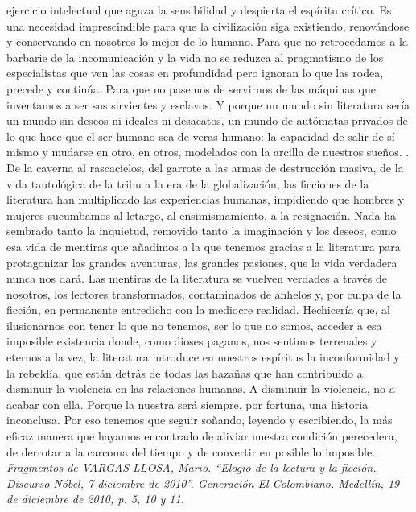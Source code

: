 \documentclass[a4paper,12pt]{article}
\begin{document}
ejercicio intelectual que aguza la sensibilidad y despierta el espíritu crítico. Es una necesidad imprescindible para que la civilización siga existiendo, renovándose y conservando en nosotros lo mejor de lo humano. Para que no retrocedamos a la barbarie de la incomunicación y la vida no se reduzca al pragmatismo de los especialistas que ven las cosas en profundidad pero ignoran lo que las rodea, precede y continúa. Para que no pasemos de servirnos de las máquinas que inventamos a ser sus sirvientes y esclavos. Y porque un mundo sin literatura sería un mundo sin deseos ni ideales ni desacatos, un mundo de autómatas privados de lo que hace que el ser humano sea de veras humano: la capacidad de salir de sí mismo y mudarse en otro, en otros, modelados con la arcilla de nuestros sueños. . De la caverna al rascacielos, del garrote a las armas de destrucción masiva, de la vida tautológica de la tribu a la era de la globalización, las ficciones de la literatura han multiplicado las experiencias humanas, impidiendo que hombres y mujeres sucumbamos al letargo, al ensimismamiento, a la resignación. Nada ha sembrado tanto la inquietud, removido tanto la imaginación y los deseos, como esa vida de mentiras que añadimos a la que tenemos gracias a la literatura para protagonizar las grandes aventuras, las grandes pasiones, que la vida verdadera nunca nos dará. Las mentiras de la literatura se vuelven verdades a través de nosotros, los lectores transformados, contaminados de anhelos y, por culpa de la ficción, en permanente entredicho con la mediocre realidad. Hechicería que, al ilusionarnos con tener lo que no tenemos, ser lo que no somos, acceder a esa imposible existencia donde, como dioses paganos, nos sentimos terrenales y eternos a la vez, la literatura introduce en nuestros espíritus la inconformidad y la rebeldía, que están detrás de todas las hazañas que han contribuido a disminuir la violencia en las relaciones humanas. A disminuir la violencia, no a acabar con ella. Porque la nuestra será siempre, por fortuna, una historia inconclusa. Por eso tenemos que seguir soñando, leyendo y escribiendo, la más eficaz manera que hayamos encontrado de aliviar nuestra condición perecedera, de derrotar a la carcoma del tiempo y de convertir en posible lo imposible. \newline \textsl{ Fragmentos de VARGAS LLOSA, Mario. “Elogio de la lectura y la ficción. Discurso Nóbel, 7 diciembre de 2010”. Generación  El Colombiano. Medellín, 19 de diciembre de 2010, p. 5, 10 y 11. } \newline 
\end{document}
